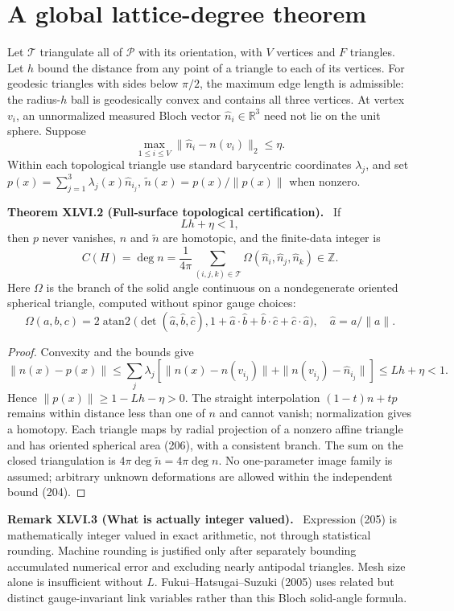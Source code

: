 \documentclass[11pt,a4paper,oneside]{book}
\newcommand{\R}{\mathbb R}\newcommand{\C}{\mathbb C}\newcommand{\Z}{\mathbb Z}\newcommand{\N}{\mathbb N}\newcommand{\Q}{\mathbb Q}
\newcommand{\statement}[3]{\par\medskip\noindent\textbf{#1 #2 (#3).}\ }
\begin{document}
\section{A global lattice-degree theorem}
Let $\mathcal T$ triangulate all of $\mathcal P$ with its orientation, with $V$ vertices and $F$ triangles. Let $h$ bound the distance from any point of a triangle to each of its vertices. For geodesic triangles with sides below $\pi/2$, the maximum edge length is admissible: the radius-$h$ ball is geodesically convex and contains all three vertices. At vertex $v_i$, an unnormalized measured Bloch vector $\widehat n_i\in\R^3$ need not lie on the unit sphere. Suppose
\begin{equation}\max_{1\le i\le V}\|\widehat n_i-n(v_i)\|_2\le\eta.\tag{203}\end{equation}
Within each topological triangle use standard barycentric coordinates $\lambda_j$, and set $p(x)=\sum_{j=1}^3\lambda_j(x)\widehat n_{i_j}$, $\widetilde n(x)=p(x)/\|p(x)\|$ when nonzero.
\statement{Theorem}{XLVI.2}{Full-surface topological certification}
If
\begin{equation}Lh+\eta<1,\tag{204}\end{equation}
then $p$ never vanishes, $n$ and $\widetilde n$ are homotopic, and the finite-data integer is
\begin{equation}C(H)=\deg n=\frac1{4\pi}\sum_{(i,j,k)\in\mathcal T}\Omega(\widehat n_i,\widehat n_j,\widehat n_k)\in\Z.\tag{205}\end{equation}
Here $\Omega$ is the branch of the solid angle continuous on a nondegenerate oriented spherical triangle, computed without spinor gauge choices:
\begin{equation}\Omega(a,b,c)=2\operatorname{atan2}\bigl(\det(\widehat a,\widehat b,\widehat c),1+\widehat a\cdot\widehat b+\widehat b\cdot\widehat c+\widehat c\cdot\widehat a\bigr),\quad\widehat a=a/\|a\|.\tag{206}\end{equation}
\begin{proof}
Convexity and the bounds give
\[\|n(x)-p(x)\|\le\sum_j\lambda_j[\|n(x)-n(v_{i_j})\|+\|n(v_{i_j})-\widehat n_{i_j}\|]\le Lh+\eta<1.\]
Hence $\|p(x)\|\ge1-Lh-\eta>0$. The straight interpolation $(1-t)n+tp$ remains within distance less than one of $n$ and cannot vanish; normalization gives a homotopy. Each triangle maps by radial projection of a nonzero affine triangle and has oriented spherical area (206), with a consistent branch. The sum on the closed triangulation is $4\pi\deg\widetilde n=4\pi\deg n$. No one-parameter image family is assumed; arbitrary unknown deformations are allowed within the independent bound (204).
\end{proof}
\statement{Remark}{XLVI.3}{What is actually integer valued}
Expression (205) is mathematically integer valued in exact arithmetic, not through statistical rounding. Machine rounding is justified only after separately bounding accumulated numerical error and excluding nearly antipodal triangles. Mesh size alone is insufficient without $L$. Fukui--Hatsugai--Suzuki (2005) uses related but distinct gauge-invariant link variables rather than this Bloch solid-angle formula.
\end{document}
